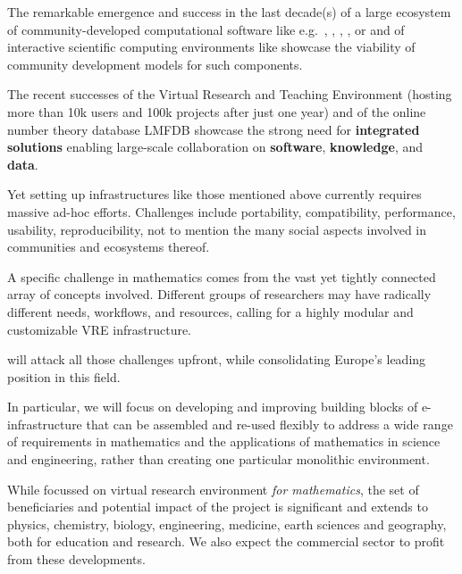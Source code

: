 \documentclass[noworkareas,deliverables,keys]{euproposal}                  %
\begin{document}
\begin{proposal}
The remarkable emergence and success in the last decade(s) of a large ecosystem of
community-developed computational software like e.g.\ \GAP, \Linbox, \PariGP, \Sage, or
\Singular and of interactive scientific computing environments like \IPython showcase the
viability of community development models for such components.


The recent successes of the Virtual Research and Teaching Environment \SMC (hosting more
than 10k users and 100k projects after just one year) and of the online number theory
database LMFDB showcase the strong need for \textbf{integrated solutions} enabling
large-scale collaboration on \textbf{software}, \textbf{knowledge}, and \textbf{data}.

Yet setting up infrastructures like those mentioned above currently requires massive
ad-hoc efforts. Challenges include portability, compatibility, performance, usability,
reproducibility, not to mention the many social aspects involved in communities and
ecosystems thereof.

A specific challenge in mathematics comes from the vast yet tightly connected array of
concepts involved. Different groups of researchers may have radically different needs,
workflows, and resources, calling for a highly modular and customizable VRE
infrastructure.

\TheProject will attack all those challenges upfront, while consolidating Europe's leading
position in this field.



In particular, we will focus on developing and improving building
blocks of e-infrastructure that can be assembled and re-used flexibly
to address a wide range of requirements in mathematics and the
applications of mathematics in science and engineering, rather than
creating one particular monolithic environment.


While focussed on virtual research environment \emph{for mathematics},
the set of beneficiaries and potential impact of the project is
significant and extends to physics, chemistry, biology, engineering,
medicine, earth sciences and geography, both for education and
research. We also expect the commercial sector to profit from these
developments.



\end{proposal}
\end{document}
